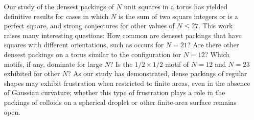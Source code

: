 \documentclass[preprint,aps]{revtex4}
\begin{document}

Our study of the densest packings of $N$ unit squares in a torus has yielded definitive results for cases in which $N$ is the sum of two square integers or is a perfect square, and strong conjectures for other values of $N \le 27$.  This work raises many interesting questions: How common are densest packings that have squares with different orientations, such as occurs for $N=21$?  Are there other densest packings on a torus similar to the configuration for $N=12$?  Which motifs, if any, dominate for large $N$?  Is the $1/2 \times 1/2$ motif of $N=12$ and $N=23$ exhibited for other $N$?  As our study has demonstrated, dense packings of regular shapes may exhibit frustration when restricted to finite areas, even in the absence of Gaussian curvature; whether this type of frustration plays a role in the packings of colloids on a spherical droplet or other finite-area surface remains open. 

%






\end{document}
